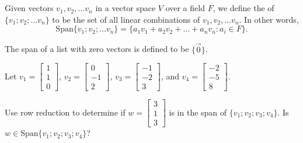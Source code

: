 \\
\\


\edXsolution{ 
}


\endedxproblem

\endedxvertical





\endedxvertical




Given vectors $v_1, v_2, \ldots v_n$ in a vector space $V$ over a field $F$, we define
the {} of $\{v_1; v_2; \ldots v_n\}$ to be the set of all linear combinations
of  $v_1, v_2, \ldots v_n$.  In other words, 
\[ \mathrm{Span}\{v_1; v_2; \ldots v_n\} = \{a_1 v_1  + a_2 v_2 + \ldots + a_nv_n  : a_i \in F \}.\]

The span of a list with zero vectors is defined to be $\{\vec0\}$.  


\endedxtext





Let $v_1 = \left[\begin{array}{c} 1 \\ 1  \\ 0 \end{array} \right]$, 
$v_2 = \left[\begin{array}{c} 0 \\ -1  \\ 2 \end{array} \right]$,
$v_3 = \left[\begin{array}{c} -1 \\ -2  \\ 3 \end{array} \right]$, and
$v_4 = \left[\begin{array}{c} -2 \\ -5  \\ 8 \end{array} \right]$.  

Use row reduction to determine if  $w = \left[\begin{array}{c} 3 \\ 1 \\ 3 \end{array} \right]$
is in the span of $\{v_1; v_2; v_3; v_4 \}$.  Is $w \in \mathrm{Span}\{v_1; v_2; v_3; v_4 \}$?   

